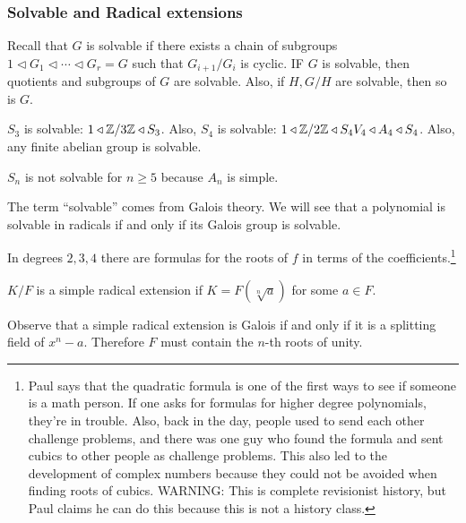 \documentclass[10pt, twoside]{article}
\begin{document}
        \subsubsection{Solvable and Radical extensions} Recall that $G$ is
        solvable if there exists a chain of subgroups $1 \triangleleft G_1
        \triangleleft \cdots \triangleleft G_r = G$ such that $G_{i+1}/G_i$ is
        cyclic. IF $G$ is solvable, then quotients and subgroups of $G$ are
        solvable. Also, if $H,G/H$ are solvable, then so is $G$.

        \begin{exm} $S_3$ is solvable: $1 \triangleleft \mathbb{Z}/3\mathbb{Z} \triangleleft
        S_3$. Also, $S_4$ is solvable: $1 \triangleleft \mathbb{Z}/2\mathbb{Z} \triangleleft
    S_4 V_4 \triangleleft A_4 \triangleleft S_4$. Also, any finite abelian
group is solvable.  \end{exm}

        \begin{exm} $S_n$ is not solvable for $n \geq 5$ because $A_n$ is
        simple.  \end{exm}

        The term ``solvable'' comes from Galois theory. We will see that a
        polynomial is solvable in radicals if and only if its Galois group is
        solvable.

        \begin{exm} In degrees $2,3,4$ there are formulas for the roots of $f$
            in terms of the coefficients.\footnote{Paul says that the quadratic
            formula is one of the first ways to see if someone is a math
        person. If one asks for formulas for higher degree polynomials, they're
    in trouble. Also, back in the day, people used to send each other challenge
problems, and there was one guy who found the formula and sent cubics to other
people as challenge problems. This also led to the development of complex
numbers because they could not be avoided when finding roots of cubics.
WARNING: This is complete revisionist history, but Paul claims he can do this
because this is not a history class.} \end{exm}
        
        \begin{defn} $K/F$ is a simple radical
        extension if $K = F(\sqrt[n]{a})$ for some $a \in F$.  \end{defn}

        Observe that a simple radical extension is Galois if and only if it is
        a splitting field of $x^n-a$. Therefore $F$ must contain the $n$-th
        roots of unity.
\end{document}
